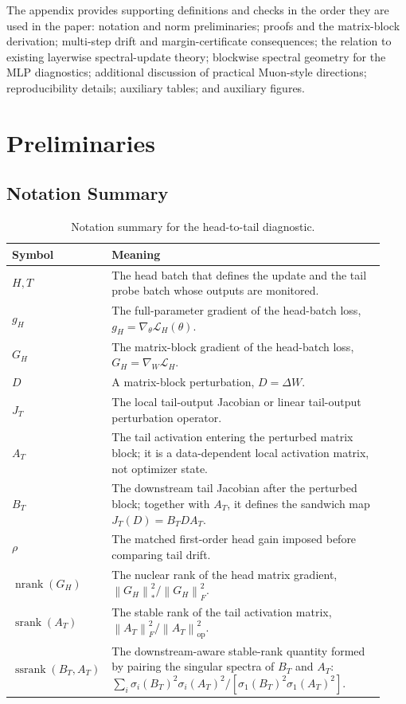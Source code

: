 \documentclass{article}
\theoremstyle{definition}
\newcommand{\Loss}{\mathcal L}
\newcommand{\op}{\mathrm{op}}
\newcommand{\norm}[1]{\left\lVert #1 \right\rVert}
\newcommand{\srank}{\operatorname{srank}}
\newcommand{\nrank}{\operatorname{nrank}}
\newcommand{\ssrank}{\operatorname{ssrank}}
\begin{document}
\clearpage
\appendix

The appendix provides supporting definitions and checks in the order they are used in the paper: notation and norm preliminaries; proofs and the matrix-block derivation; multi-step drift and margin-certificate consequences; the relation to existing layerwise spectral-update theory; blockwise spectral geometry for the MLP diagnostics; additional discussion of practical Muon-style directions; reproducibility details; auxiliary tables; and auxiliary figures.

\section{Preliminaries}
\label{app:preliminaries}

\subsection{Notation Summary}

\begin{table}[H]
\centering
\caption{Notation summary for the head-to-tail diagnostic.}
\label{tab:notation-summary}
\footnotesize
\begin{tabular}{@{}p{0.18\linewidth}p{0.75\linewidth}@{}}
\toprule
Symbol & Meaning \\
\midrule
\(H,T\) & The head batch that defines the update and the tail probe batch whose outputs are monitored. \\
\(g_H\) & The full-parameter gradient of the head-batch loss, \(g_H=\nabla_\theta\Loss_H(\theta)\). \\
\(G_H\) & The matrix-block gradient of the head-batch loss, \(G_H=\nabla_W\Loss_H\). \\
\(D\) & A matrix-block perturbation, \(D=\Delta W\). \\
\(J_T\) & The local tail-output Jacobian or linear tail-output perturbation operator. \\
\(A_T\) & The tail activation entering the perturbed matrix block; it is a data-dependent local activation matrix, not optimizer state. \\
\(B_T\) & The downstream tail Jacobian after the perturbed block; together with \(A_T\), it defines the sandwich map \(J_T(D)=B_TDA_T\). \\
\(\rho\) & The matched first-order head gain imposed before comparing tail drift. \\
\(\nrank(G_H)\) & The nuclear rank of the head matrix gradient, \(\norm{G_H}_*^2/\norm{G_H}_F^2\). \\
\(\srank(A_T)\) & The stable rank of the tail activation matrix, \(\norm{A_T}_F^2/\norm{A_T}_{\op}^2\). \\
\(\ssrank(B_T,A_T)\) & The downstream-aware stable-rank quantity formed by pairing the singular spectra of \(B_T\) and \(A_T\): \(\sum_i\sigma_i(B_T)^2\sigma_i(A_T)^2/[\sigma_1(B_T)^2\sigma_1(A_T)^2]\). \\
\bottomrule
\end{tabular}
\end{table}
\end{document}
